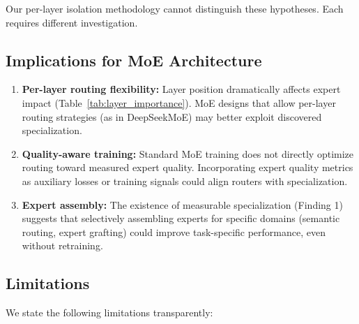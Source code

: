 \documentclass[11pt,a4paper]{article}
\begin{document}
Our per-layer isolation methodology cannot distinguish these hypotheses. Each requires different investigation.

\subsection{Implications for MoE Architecture}

\begin{enumerate}
\item \textbf{Per-layer routing flexibility:} Layer position dramatically affects expert impact (Table~\ref{tab:layer_importance}). MoE designs that allow per-layer routing strategies (as in DeepSeekMoE) may better exploit discovered specialization.

\item \textbf{Quality-aware training:} Standard MoE training does not directly optimize routing toward measured expert quality. Incorporating expert quality metrics as auxiliary losses or training signals could align routers with specialization.

\item \textbf{Expert assembly:} The existence of measurable specialization (Finding 1) suggests that selectively assembling experts for specific domains (semantic routing, expert grafting) could improve task-specific performance, even without retraining.
\end{enumerate}

\subsection{Limitations}

We state the following limitations transparently:
\end{document}
